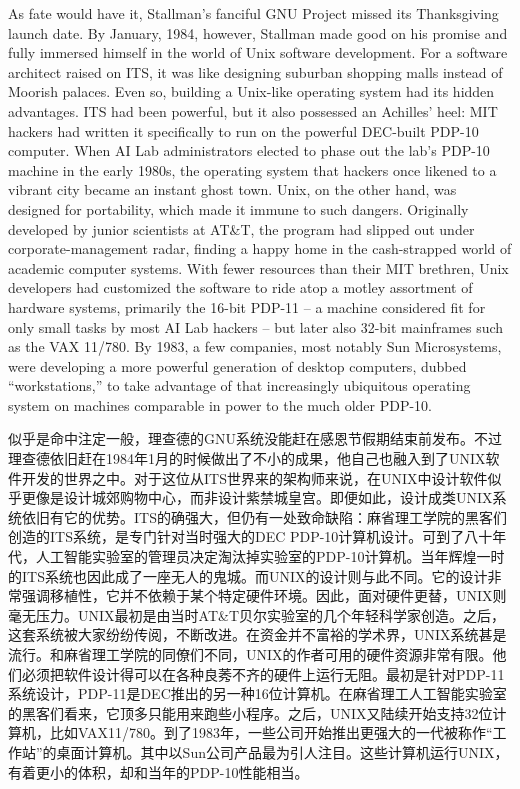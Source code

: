 \ifdefined\eng
As fate would have it, Stallman's fanciful GNU Project missed its Thanksgiving launch date. By January, 1984, however, Stallman made good on his promise and fully immersed himself in the world of Unix software development. For a software architect raised on ITS, it was like designing suburban shopping malls instead of Moorish palaces. Even so, building a Unix-like operating system had its hidden advantages. ITS had been powerful, but it also possessed an Achilles' heel: MIT hackers had written it specifically to run on the powerful DEC-built PDP-10 computer. When AI Lab administrators elected to phase out the lab's PDP-10 machine in the early 1980s, the operating system that hackers once likened to a vibrant city became an instant ghost town. Unix, on the other hand, was designed for portability, which made it immune to such dangers. Originally developed by junior scientists at AT\&T, the program had slipped out under corporate-management radar, finding a happy home in the cash-strapped world of academic computer systems. With fewer resources than their MIT brethren, Unix developers had customized the software to ride atop a motley assortment of hardware systems, primarily the 16-bit PDP-11 -- a machine considered fit for only small tasks by most AI Lab hackers -- but later also 32-bit mainframes such as the VAX 11/780. By 1983, a few companies, most notably Sun Microsystems, were developing a more powerful generation of desktop computers, dubbed ``workstations,'' to take advantage of that increasingly ubiquitous operating system on machines comparable in power to the much older PDP-10.
\fi

\ifdefined\chs
似乎是命中注定一般，理查德的GNU系统没能赶在感恩节假期结束前发布。不过理查德依旧赶在1984年1月的时候做出了不小的成果，他自己也融入到了UNIX软件开发的世界之中。对于这位从ITS世界来的架构师来说，在UNIX中设计软件似乎更像是设计城郊购物中心，而非设计紫禁城皇宫。即便如此，设计成类UNIX系统依旧有它的优势。ITS的确强大，但仍有一处致命缺陷：麻省理工学院的黑客们创造的ITS系统，是专门针对当时强大的DEC PDP-10计算机设计。可到了八十年代，人工智能实验室的管理员决定淘汰掉实验室的PDP-10计算机。当年辉煌一时的ITS系统也因此成了一座无人的鬼城。而UNIX的设计则与此不同。它的设计非常强调移植性，它并不依赖于某个特定硬件环境。因此，面对硬件更替，UNIX则毫无压力。UNIX最初是由当时AT\&T贝尔实验室的几个年轻科学家创造。之后，这套系统被大家纷纷传阅，不断改进。在资金并不富裕的学术界，UNIX系统甚是流行。和麻省理工学院的同僚们不同，UNIX的作者可用的硬件资源非常有限。他们必须把软件设计得可以在各种良莠不齐的硬件上运行无阻。最初是针对PDP-11系统设计，PDP-11是DEC推出的另一种16位计算机。在麻省理工人工智能实验室的黑客们看来，它顶多只能用来跑些小程序。之后，UNIX又陆续开始支持32位计算机，比如VAX11/780。到了1983年，一些公司开始推出更强大的一代被称作“工作站”的桌面计算机。其中以Sun公司产品最为引人注目。这些计算机运行UNIX，有着更小的体积，却和当年的PDP-10性能相当。
\fi

